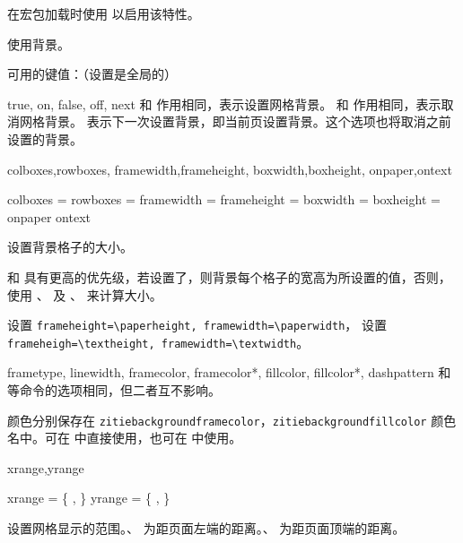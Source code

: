 \documentclass{ctxdoc}
\begin{document}
在宏包加载时使用  以启用该特性。

\begin{function}{\zitiebackground}
  \begin{syntax}
     
  \end{syntax}
  使用背景。
\end{function}

 可用的键值：（设置是全局的）

\begin{function}{true, on, false, off, next}
   和  作用相同，表示设置网格背景。
   和  作用相同，表示取消网格背景。
   表示下一次设置背景，即当前页设置背景。这个选项也将取消之前设置的背景。
\end{function}

\begin{function}{
  colboxes,rowboxes,
  framewidth,frameheight,
  boxwidth,boxheight,
  onpaper,ontext
}
  \begin{syntax}
    colboxes    =  
    rowboxes    =  
    framewidth  = 
    frameheight = 
    boxwidth    = 
    boxheight   = 
    onpaper
    ontext
  \end{syntax}
  设置背景格子的大小。

   和  具有更高的优先级，若设置了，则背景每个格子的宽高为所设置的值，否则，使用 、 及 、 来计算大小。

   设置 \verb|frameheight=\paperheight, framewidth=\paperwidth|，
   设置 \verb|frameheigh=\textheight, framewidth=\textwidth|。
\end{function}

\begin{function}{
  frametype,
  linewidth,
  framecolor,
  framecolor*,
  fillcolor,
  fillcolor*,
  dashpattern
}
  和  等命令的选项相同，但二者互不影响。

  颜色分别保存在 \verb|zitiebackgroundframecolor|，\verb|zitiebackgroundfillcolor| 颜色名中。可在  中直接使用，也可在  中使用。
\end{function}

\begin{function}{xrange,yrange}
  \begin{syntax}
    xrange = \{  ,  \} \init{{0cm, \paperwidth}}
    yrange = \{  ,  \} \init{{0cm, \paperheight}}
  \end{syntax}
  设置网格显示的范围。、 为距页面左端的距离。、 为距页面顶端的距离。
\end{function}
\end{document}
